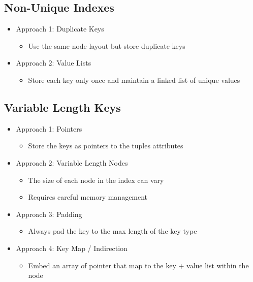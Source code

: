 \documentclass[11pt]{article}
\begin{document}
    \subsection*{Non-Unique Indexes~\cite{p203-graefe}}
        \begin{itemize}
            \item Approach 1: Duplicate Keys
            \begin{itemize}
                \item Use the same node layout but store duplicate keys
            \end{itemize}
            \item Approach 2: Value Lists
            \begin{itemize}
                \item Store each key only once and maintain a linked list of unique values
            \end{itemize}
        \end{itemize}

    \subsection*{Variable Length Keys}
        \begin{itemize}
            \item Approach 1: Pointers
            \begin{itemize}
                \item Store the keys as pointers to the tuples attributes
            \end{itemize}
            \item Approach 2: Variable Length Nodes
            \begin{itemize}
                \item The size of each node in the index can vary
                \item Requires careful memory management
            \end{itemize}
            \item Approach 3: Padding
            \begin{itemize}
                \item Always pad the key to the max length of the key type
            \end{itemize}
            \item Approach 4: Key Map / Indirection
            \begin{itemize}
                \item Embed an array of pointer that map to the key + value list within the node
            \end{itemize}
        \end{itemize}
\end{document}
